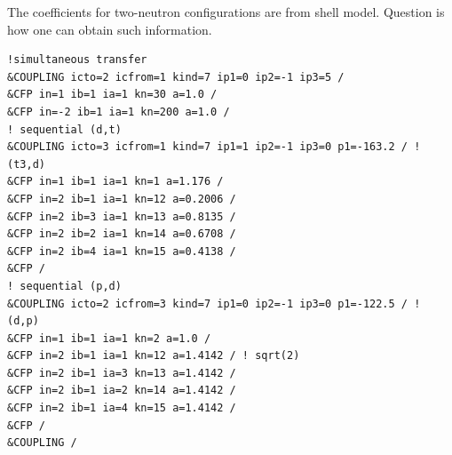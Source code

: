 \documentclass[11pt]{book}
\begin{document}
The coefficients for two-neutron configurations are from shell model.
Question is how one can obtain such information. 
 
\begin{small} \begin{lstlisting}[frame=single]
!simultaneous transfer
&COUPLING icto=2 icfrom=1 kind=7 ip1=0 ip2=-1 ip3=5 /
&CFP in=1 ib=1 ia=1 kn=30 a=1.0 /
&CFP in=-2 ib=1 ia=1 kn=200 a=1.0 /
! sequential (d,t)
&COUPLING icto=3 icfrom=1 kind=7 ip1=1 ip2=-1 ip3=0 p1=-163.2 / ! (t3,d)
&CFP in=1 ib=1 ia=1 kn=1 a=1.176 /
&CFP in=2 ib=1 ia=1 kn=12 a=0.2006 /
&CFP in=2 ib=3 ia=1 kn=13 a=0.8135 /
&CFP in=2 ib=2 ia=1 kn=14 a=0.6708 /
&CFP in=2 ib=4 ia=1 kn=15 a=0.4138 /
&CFP /
! sequential (p,d)
&COUPLING icto=2 icfrom=3 kind=7 ip1=0 ip2=-1 ip3=0 p1=-122.5 / ! (d,p)
&CFP in=1 ib=1 ia=1 kn=2 a=1.0 /
&CFP in=2 ib=1 ia=1 kn=12 a=1.4142 / ! sqrt(2) 
&CFP in=2 ib=1 ia=3 kn=13 a=1.4142 /
&CFP in=2 ib=1 ia=2 kn=14 a=1.4142 /
&CFP in=2 ib=1 ia=4 kn=15 a=1.4142 /
&CFP /
&COUPLING /
\end{lstlisting}\end{small} 
\end{document}
